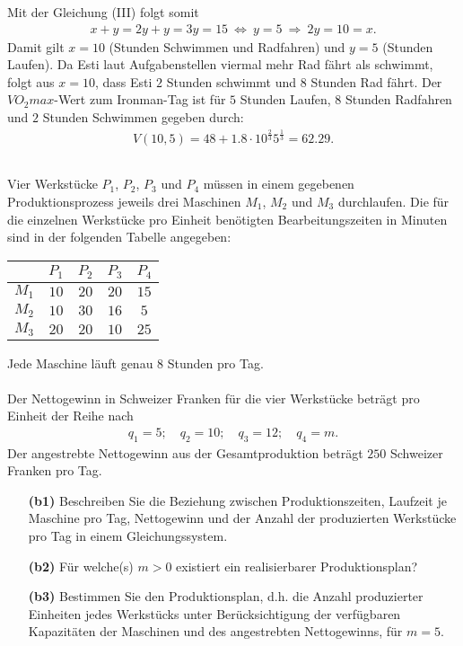 Mit der Gleichung (III) folgt somit
\begin{align*}
	x + y = 2y + y = 3y =  15
	\ \Leftrightarrow \
	y = 5
	\ \Rightarrow \ 2y = 10 = x.
\end{align*}
Damit gilt $x = 10 $ (Stunden Schwimmen und Radfahren) und $y= 5$ (Stunden Laufen).
Da Esti laut Aufgabenstellen viermal mehr Rad fährt als schwimmt, folgt aus $x = 10$, dass Esti $2 $ Stunden schwimmt und $8$ Stunden Rad fährt.
Der $VO_2max$-Wert zum Ironman-Tag ist für $5$ Stunden Laufen, $8$ Stunden Radfahren und $2$ Stunden Schwimmen gegeben durch:
\begin{align*}
	V(10,5)
	= 
	48 + 1.8 \cdot 10^{\frac{2}{3} } 5^{\frac{1}{3}}
	=
	62.29.
\end{align*}
\newpage

\subsection*{}
Vier Werkstücke $P_1$, $P_2$, $P_3$ und $P_4$ müssen in einem gegebenen Produktionsprozess jeweils drei Maschinen $M_1$, $M_2$ und $M_3$ durchlaufen.
Die für die einzelnen Werkstücke pro Einheit benötigten Bearbeitungszeiten in Minuten sind in der folgenden Tabelle angegeben: 
\begin{table}[H]
	\centering
	\begin{tabular}{c | c c c c}
		$ $  & $P_1$  &  $P_2$ &  $P_3$ & $P_4$ \\ 
		\hline
		$ M_1 $ & $ 10 $ & $ 20 $ & $ 20 $ & $15$  \\ 
		$ M_2 $ & $ 10 $ & $ 30 $ & $ 16 $ & $5$ \\
		$ M_3 $ & $ 20 $ & $ 20 $ & $ 10 $ & $25$
	\end{tabular}%
\end{table}
Jede Maschine läuft genau $8$ Stunden pro Tag.\\
\\
Der Nettogewinn in Schweizer Franken für die vier Werkstücke beträgt pro Einheit der Reihe nach
\begin{align*}
	q_1 = 5; \quad
	q_2=  10; \quad
	q_3=12; \quad 
	q_4=m.
\end{align*}
Der angestrebte Nettogewinn aus der Gesamtproduktion beträgt $250$ Schweizer Franken pro Tag.
\begin{enumerate}
	\item[\textbf{(b1)}]
	Beschreiben Sie die Beziehung zwischen Produktionszeiten, Laufzeit je Maschine pro Tag, Nettogewinn und der Anzahl der produzierten Werkstücke pro Tag in einem Gleichungssystem.
	
	\item[\textbf{(b2)}] 
	Für welche(s) $m > 0$ existiert ein realisierbarer Produktionsplan?
	\item[\textbf{(b3)}]
	Bestimmen Sie den Produktionsplan, d.h. die Anzahl produzierter Einheiten jedes Werkstücks unter Berücksichtigung der verfügbaren Kapazitäten der Maschinen und des angestrebten Nettogewinns, für $m = 5$.
\end{enumerate}
